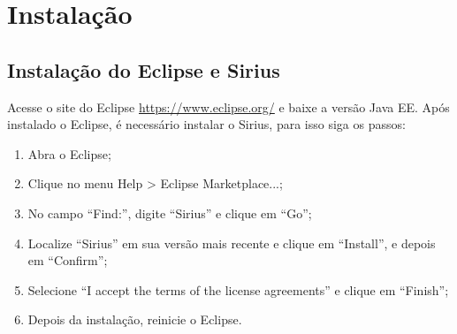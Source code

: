 \documentclass[
article,			%
11pt,				%
oneside,			%
a4paper,			%
english,			%
brazil,				%
sumario=tradicional
]{abntex2}
\begin{document}
	
	
	\frenchspacing 
	
	
	
	\maketitle
	
	
	
	\textual
	
\section{Instalação}

\subsection{Instalação do Eclipse e Sirius}
Acesse o site do Eclipse \url{https://www.eclipse.org/} e baixe a versão Java EE. Após instalado o Eclipse, é necessário instalar o Sirius, para isso siga os passos:
\begin{enumerate}
	\item Abra o Eclipse;
	\item Clique no menu Help > Eclipse Marketplace...;
	\item No campo ``Find:'', digite ``Sirius'' e clique em ``Go'';
	\item Localize ``Sirius'' em sua versão mais recente e clique em ``Install'', e depois em ``Confirm'';
	\item Selecione ``I accept the terms of the license agreements'' e clique em ``Finish'';
	\item Depois da instalação, reinicie o Eclipse.
\end{enumerate} 
	
\end{document}
